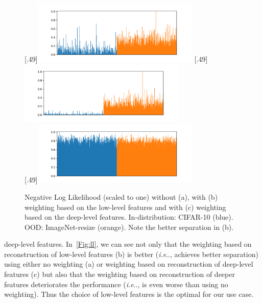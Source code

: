 \documentclass[accepted]{uai2022} %
\makeatletter
\DeclareRobustCommand\onedot{\futurelet\@let@token\@onedot}
\def\@onedot{\ifx\@let@token.\else.\null\fi\xspace}
\def\ie{\emph{i.e}\onedot} \def\Ie{\emph{I.e}\onedot}
\makeatother
\begin{document}
\begin{figure}[ht]
    \centering
    [.49\linewidth]{\includegraphics[height=3cm,trim=1.5cm 0.0cm 0.0cm 0.7cm,clip]{pre_ae_features.png}} 
    [.49\linewidth]{\includegraphics[height=3cm,trim=1.5cm 0.0cm 0.0cm 0.7cm,clip]{post_ae_features.png}} \\
    [.49\linewidth]{\includegraphics[height=3cm,trim=1.5cm 0.0cm 0.0cm 0.7cm,clip]{pose_ae_features_bad.png}} 
    \caption{Negative Log Likelihood (scaled to one) without (a), with (b) weighting based on the low-level features and with (c) weighting based on the deep-level features.
    In-distribution: CIFAR-10 (blue). OOD: ImageNet-resize (orange).
    Note the better separation in (b).}
     \label{Fig:ll}
\end{figure}
deep-level features. %
In~\autoref{Fig:ll}, we can see not only that the weighting based on reconstruction of low-level features (b) is better (\ie, achieves better separation) using either no weighting (a) or weighting based on reconstruction of deep-level features (c) but also that the weighting based on reconstruction of deeper features deteriorates the performance (\ie, is even worse than using no weighting). Thus the choice of low-level features is the  optimal for our use case.
\end{document}
